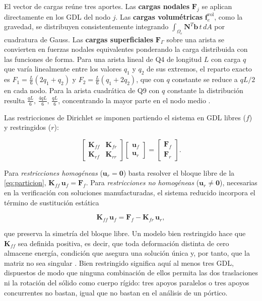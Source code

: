 El vector de cargas reúne tres aportes. Las \textbf{cargas nodales} $\bm{F}_j$ se aplican directamente en los GDL del nodo $j$. Las \textbf{cargas volumétricas} $\bm{f}_e^{\text{vol}}$, como la gravedad, se distribuyen consistentemente integrando $\int_{\Omega_e} \bm{N}^T \bm{b}\, t\, dA$ por cuadratura de Gauss. Las \textbf{cargas superficiales} $\bm{F}_\Gamma$ sobre una arista se convierten en fuerzas nodales equivalentes ponderando la carga distribuida con las funciones de forma. Para una arista lineal de Q4 de longitud $L$ con carga $q$ que varía linealmente entre los valores $q_1$ y $q_2$ de sus extremos, el reparto exacto es $F_1 = \tfrac{L}{6}(2q_1 + q_2)$ y $F_2 = \tfrac{L}{6}(q_1 + 2q_2)$, que con $q$ constante se reduce a $qL/2$ en cada nodo. Para la arista cuadrática de Q9 con $q$ constante la distribución resulta $\tfrac{qL}{6},\,\tfrac{4qL}{6},\,\tfrac{qL}{6}$, concentrando la mayor parte en el nodo medio \autocite[p.~113]{cook2002concepts}.

Las restricciones de Dirichlet se imponen partiendo el sistema en GDL libres ($f$) y restringidos ($r$):

\begin{equation}
\begin{bmatrix} \bm{K}_{ff} & \bm{K}_{fr} \\ \bm{K}_{rf} & \bm{K}_{rr} \end{bmatrix}
\begin{bmatrix} \bm{u}_f \\ \bm{u}_r \end{bmatrix}
=
\begin{bmatrix} \bm{F}_f \\ \bm{F}_r \end{bmatrix}.
\label{eq:particion}
\end{equation}

Para \emph{restricciones homogéneas} ($\bm{u}_r = \bm{0}$) basta resolver el bloque libre de la \autoref{eq:particion}, $\bm{K}_{ff}\,\bm{u}_f = \bm{F}_f$. Para \emph{restricciones no homogéneas} ($\bm{u}_r \neq \bm{0}$), necesarias en la verificación con soluciones manufacturadas, el sistema reducido incorpora el término de sustitución estática

\begin{equation}
\bm{K}_{ff}\,\bm{u}_f = \bm{F}_f - \bm{K}_{fr}\,\bm{u}_r,
\label{eq:dirichlet-no-homogeneo}
\end{equation}

que preserva la simetría del bloque libre. Un modelo bien restringido hace que $\bm{K}_{ff}$ sea definida positiva, es decir, que toda deformación distinta de cero almacene energía, condición que asegura una solución única y, por tanto, que la matriz no sea singular \autocite[pp.~726-727]{bathe2014fem}. Bien restringido significa aquí al menos tres GDL, dispuestos de modo que ninguna combinación de ellos permita las dos traslaciones ni la rotación del sólido como cuerpo rígido: tres apoyos paralelos o tres apoyos concurrentes no bastan, igual que no bastan en el análisis de un pórtico.

